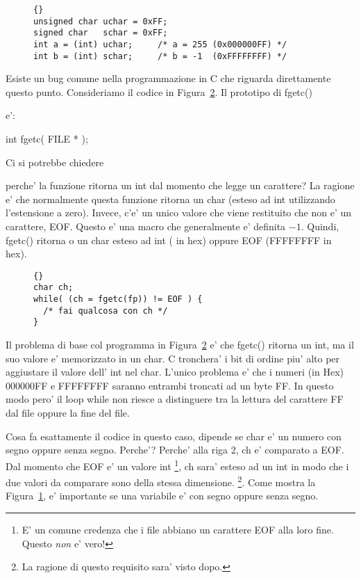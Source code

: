 \begin{figure}[t]
\begin{lstlisting}[frame=tlrb]{}
unsigned char uchar = 0xFF;
signed char   schar = 0xFF;
int a = (int) uchar;     /* a = 255 (0x000000FF) */
int b = (int) schar;     /* b = -1  (0xFFFFFFFF) */
\end{lstlisting}
\caption{}
\label{fig:charExt}
\end{figure}

Esiste un bug comune nella programmazione in C che riguarda direttamente 
questo punto. Consideriamo il codice in Figura~\ref{fig:IObug}. Il 
prototipo di {\code fgetc()}{\samepage e':
\begin{CodeQuote}
int fgetc( FILE * );
\end{CodeQuote}
Ci si potrebbe chiedere } perche' la funzione ritorna un {\code int}
dal momento che legge un carattere? La ragione e' che normalmente
questa funzione ritorna un {\code char} (esteso ad {\code int} 
utilizzando l'estensione a zero). Invece, c'e' un unico valore che
viene restituito che non e' un carattere, {\code EOF}. Questo e' una
macro che generalmente e' definita $-1$. Quindi, {\code fgetc()} 
ritorna o un {\code char} esteso ad {\code int} ({} in hex) oppure {\code EOF} ({\code FFFFFFFF} in
hex).  

\begin{figure}[t]
\begin{lstlisting}[stepnumber=0,frame=tlrb]{}
char ch;
while( (ch = fgetc(fp)) != EOF ) {
  /* fai qualcosa con ch */
}
\end{lstlisting}
\caption{}
\label{fig:IObug}
\end{figure}

Il problema di base col programma in Figura~\ref{fig:IObug} e' che
{\code fgetc()} ritorna un {\code int}, ma il suo valore e' memorizzato
in un {\code char}. C tronchera' i bit di ordine piu' alto per aggiustare
il valore dell' {\code int} nel {\code char}. L'unico problema e' che
i numeri (in Hex) {\code 000000FF} e {\code FFFFFFFF} saranno entrambi
troncati ad un byte {\code FF}. In questo modo pero' il loop while non
riesce a distinguere tra la lettura del carattere {\code FF} dal file
oppure la fine del file.

Cosa fa esattamente il codice in questo caso, dipende se {\code char} e'
un numero con segno oppure senza segno. Perche'? Perche' alla riga 2, {\code ch}
e' comparato a {\code EOF}. Dal momento che {\code EOF} e' un valore {\code int}
\footnote{E' un comune credenza che i file abbiano un carattere EOF alla
loro fine. Questo \emph{non} e' vero!}, {\code ch} sara' esteso ad un {\code int}
in modo che i due valori da comparare sono della stessa dimensione.
\footnote{La ragione di questo requisito sara' visto dopo.}.
Come mostra la Figura~\ref{fig:charExt}, e' importante se una variabile
e' con segno oppure senza segno. 

